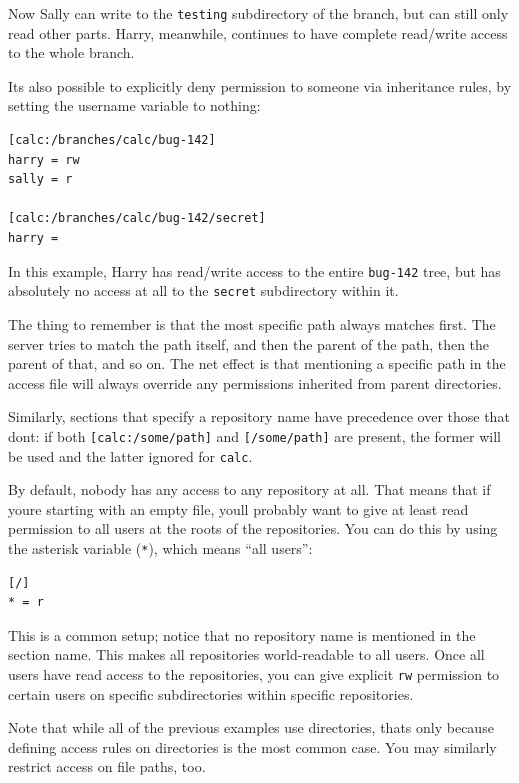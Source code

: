 Now Sally can write to the \texttt{testing} subdirectory of the branch,
but can still only read other parts. Harry, meanwhile, continues to have
complete read/write access to the whole branch.

It\textquotesingle s also possible to explicitly deny permission to
someone via inheritance rules, by setting the username variable to
nothing:

\begin{verbatim}
[calc:/branches/calc/bug-142]
harry = rw
sally = r

[calc:/branches/calc/bug-142/secret]
harry =
\end{verbatim}

In this example, Harry has read/write access to the entire
\texttt{bug-142} tree, but has absolutely no access at all to the
\texttt{secret} subdirectory within it.

The thing to remember is that the most specific path always matches
first. The server tries to match the path itself, and then the parent of
the path, then the parent of that, and so on. The net effect is that
mentioning a specific path in the access file will always override any
permissions inherited from parent directories.

Similarly, sections that specify a repository name have precedence over
those that don\textquotesingle t: if both \texttt{{[}calc:/some/path{]}}
and \texttt{{[}/some/path{]}} are present, the former will be used and
the latter ignored for \texttt{calc}.

By default, nobody has any access to any repository at all. That means
that if you\textquotesingle re starting with an empty file,
you\textquotesingle ll probably want to give at least read permission to
all users at the roots of the repositories. You can do this by using the
asterisk variable (\texttt{*}), which means ``all users'':

\begin{verbatim}
[/]
* = r
\end{verbatim}

This is a common setup; notice that no repository name is mentioned in
the section name. This makes all repositories world-readable to all
users. Once all users have read access to the repositories, you can give
explicit \texttt{rw} permission to certain users on specific
subdirectories within specific repositories.

Note that while all of the previous examples use directories,
that\textquotesingle s only because defining access rules on directories
is the most common case. You may similarly restrict access on file
paths, too.

